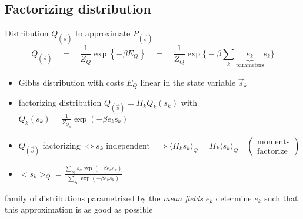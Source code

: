 \begin{frame}{\secname}
{}



 
\end{frame}

\subsection{Factorizing distribution}

\begin{frame}{\subsecname}
\begin{block}{Distribution $Q_{(\vec{s})}$ to approximate $P_{(\vec{s})}$}
\vspace{-0.35cm}
\begin{equation}
	Q_{(\vec{s})} \quad
= \quad \frac{1}{Z_Q} \exp \left\{ -\beta E_Q\right\} \quad
= \quad \frac{1}{Z_Q} \exp \Big\{ -\beta \sum\limits_{k}
		\underbrace{ e_k }_{ \text{parameters} } \mathrm{s}_k \Big\}
\end{equation}
\vspace{-0.65cm}
\begin{itemize}
 \item Gibbs distribution with costs $E_Q$ linear in the state variable $\vec{s}_k$
 \item factorizing distribution $Q_{(\vec{s})} = \Pi_k Q_k(s_k)$ with $Q_k(s_k) 
 = \frac{1}{Z_{Q_k}} \exp (-\beta e_k\mathrm{s}_k)$
 \item $Q_{(\vec{s})}$ factorizing $\iff s_k$ independent $\implies
    \langle \Pi_k s_k \rangle_Q = \Pi_k \langle s_k\rangle_Q
    \quad \!\! (\substack{\text{moments}  \\ \text{factorize}})$
 \item
 $ \big< s_k \big>_Q = \frac{\sum\limits_{s_k} s_k \exp(-\beta e_k s_k)}{
					\sum\limits_{s_k} \exp(-\beta e_k s_k)}$
\end{itemize}
\end{block}
\begin{itemize}
      \itr family of distributions parametrized by the \emph{mean fields} $e_k$
      \itr determine $e_k$ such that this approximation is as good as possible
\end{itemize}
\end{frame}


